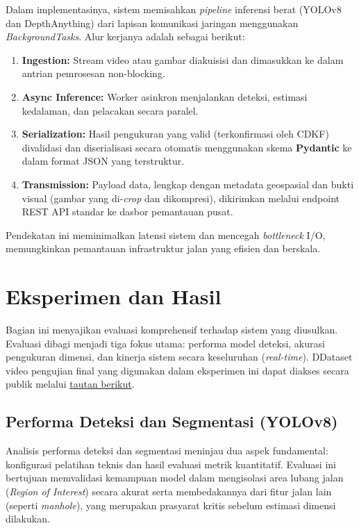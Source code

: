 \documentclass{iopjournal}
\begin{document}
Dalam implementasinya, sistem memisahkan \textit{pipeline} inferensi berat (YOLOv8 dan DepthAnything) dari lapisan komunikasi jaringan menggunakan \textit{BackgroundTasks}. Alur kerjanya adalah sebagai berikut:
\begin{enumerate}
    \item \textbf{Ingestion:} Stream video atau gambar diakuisisi dan dimasukkan ke dalam antrian pemrosesan non-blocking.
    \item \textbf{Async Inference:} Worker asinkron menjalankan deteksi, estimasi kedalaman, dan pelacakan secara paralel.
    \item \textbf{Serialization:} Hasil pengukuran yang valid (terkonfirmasi oleh CDKF) divalidasi dan diserialisasi secara otomatis menggunakan skema \textbf{Pydantic} ke dalam format JSON yang terstruktur.
    \item \textbf{Transmission:} Payload data, lengkap dengan metadata geospasial dan bukti visual (gambar yang di-\textit{crop} dan dikompresi), dikirimkan melalui endpoint REST API standar ke dasbor pemantauan pusat.
\end{enumerate}

Pendekatan ini meminimalkan latensi sistem dan mencegah \textit{bottleneck} I/O, memungkinkan pemantauan infrastruktur jalan yang efisien dan berskala.

\section{Eksperimen dan Hasil}
\label{sec:results}

Bagian ini menyajikan evaluasi komprehensif terhadap sistem yang diusulkan. Evaluasi dibagi menjadi tiga fokus utama: performa model deteksi, akurasi pengukuran dimensi, dan kinerja sistem secara keseluruhan (\textit{real-time}). DDataset video pengujian final yang digunakan dalam eksperimen ini dapat diakses secara publik melalui \href{https://drive.google.com/drive/folders/16lrRwExp21fktX2HVhk3qqVitkh83iZj?usp=sharing}{tautan berikut}.



\subsection{Performa Deteksi dan Segmentasi (YOLOv8)}
\label{sec:yolo_performance}

Analisis performa deteksi dan segmentasi meninjau dua aspek fundamental: konfigurasi pelatihan teknis dan hasil evaluasi metrik kuantitatif. Evaluasi ini bertujuan memvalidasi kemampuan model dalam mengisolasi area lubang jalan (\textit{Region of Interest}) secara akurat serta membedakannya dari fitur jalan lain (seperti \textit{manhole}), yang merupakan prasyarat kritis sebelum estimasi dimensi dilakukan.
\end{document}
